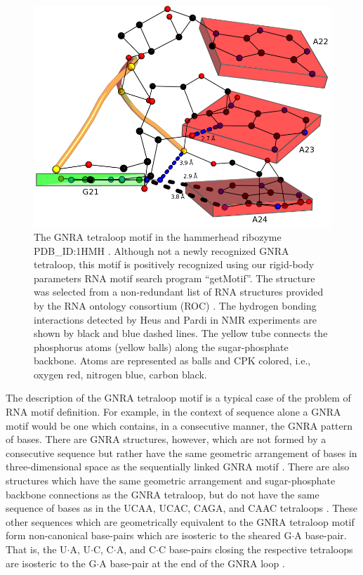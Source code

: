 \begin{figure}
\centering
\includegraphics[angle=0, scale=0.38]{Chapter5/gnra21L2.png}
\caption{The   GNRA  tetraloop  motif   in  the   hammerhead  ribozyme
  PDB\_ID:1HMH \cite{pley1994}.  Although  not a newly recognized GNRA
  tetraloop, this motif is  positively recognized using our rigid-body
  parameters RNA motif search  program ``getMotif''. The structure was
  selected from a non-redundant list of RNA structures provided by the
  RNA  ontology consortium  (ROC)  \cite{leontis2006b}.  The  hydrogen
  bonding interactions  detected by Heus and  Pardi \cite{heus1991} in
  NMR experiments are shown by black and blue dashed lines. The yellow
  tube  connects  the  phosphorus   atoms  (yellow  balls)  along  the
  sugar-phosphate backbone.   Atoms are  represented as balls  and CPK
  colored, i.e., oxygen red, nitrogen blue, carbon black.}
\label{fig:gnrablocks}
\end{figure}

The description of  the GNRA tetraloop motif is a  typical case of the
problem  of RNA  motif definition.   For  example, in  the context  of
sequence  alone  a  GNRA motif  would  be  one  which contains,  in  a
consecutive  manner,  the  GNRA  pattern  of bases.   There  are  GNRA
structures, however,  which are not  formed by a  consecutive sequence
but  rather   have  the  same   geometric  arrangement  of   bases  in
three-dimensional  space   as  the  sequentially   linked  GNRA  motif
\cite{lee2003, lemieux2006}.  There are also structures which have the
same geometric arrangement and sugar-phosphate backbone connections as
the GNRA tetraloop,  but do not have the same sequence  of bases as in
the UCAA,  UCAC, CAGA, and CAAC  tetraloops \cite{lemieux2006}.  These
other  sequences  which  are  geometrically  equivalent  to  the  GNRA
tetraloop motif  form non-canonical base-pairs which  are isosteric to
the sheared  G$\cdot$A base-pair.  That is, the  U$\cdot$A, U$\cdot$C,
C$\cdot$A, and C$\cdot$C  base-pairs closing the respective tetraloops
are isosteric to  the G$\cdot$A base-pair at the end  of the GNRA loop
\cite{lemieux2006}.

